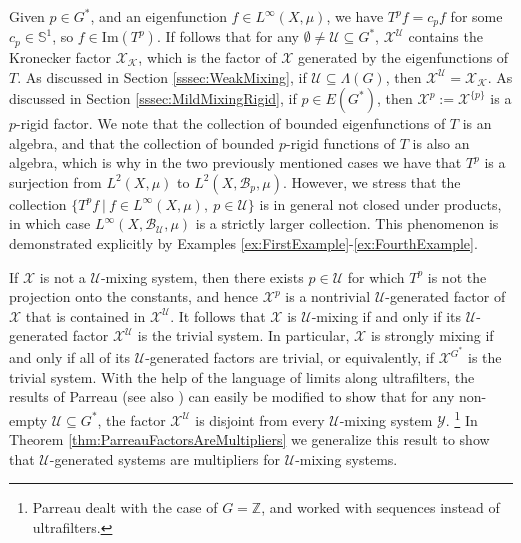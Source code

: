 \documentclass[graybox]{svmult}
\theoremstyle{definition}
\begin{document}
\begin{remark}\label{rem:PFactorBasics}
     Given $p \in G^*$, and an eigenfunction $f \in L^\infty(X,\mu)$, we have $T^pf = c_pf$ for some $c_p \in \mathbb{S}^1$, so $f \in \text{Im}(T^p)$.
     If follows that for any $\emptyset \neq \mathcal{U} \subseteq G^*$, $\mathcal{X}^\mathcal{U}$ contains the Kronecker factor $\mathcal{X}_\mathcal{K}$, which is the factor of $\mathcal{X}$ generated by the eigenfunctions of $T$.
     As discussed in Section \ref{sssec:WeakMixing}, if $\mathcal{U} \subseteq \Lambda(G)$, then $\mathcal{X}^\mathcal{U} = \mathcal{X}_\mathcal{K}$.
     As discussed in Section \ref{sssec:MildMixingRigid}, if $p \in E(G^*)$, then $\mathcal{X}^p := \mathcal{X}^{\{p\}}$ is a $p$-rigid factor.
     We note that the collection of bounded eigenfunctions of $T$ is an algebra, and that the collection of bounded $p$-rigid functions of $T$ is also an algebra, which is why in the two previously mentioned cases we have that $T^p$ is a surjection from $L^2(X,\mu)$ to $L^2(X,\mathscr{B}_p,\mu)$.
     However, we stress that the collection $\{T^pf\ |\ f \in L^\infty(X,\mu),\ p \in \mathcal{U}\}$ is in general not closed under products, in which case $L^\infty(X,\mathscr{B}_{\mathcal{U}},\mu)$ is a strictly larger collection.
     This phenomenon is demonstrated explicitly by Examples \ref{ex:FirstExample}-\ref{ex:FourthExample}.
\end{remark}

\begin{remark}\label{rem:UMixingIFFNoUParreauFactor}
    If $\mathcal{X}$ is not a $\mathcal{U}$-mixing system, then there exists $p \in \mathcal{U}$ for which $T^p$ is not the projection onto the constants, and hence $\mathcal{X}^p$ is a nontrivial $\mathcal{U}$-generated factor of $\mathcal{X}$ that is contained in $\mathcal{X}^\mathcal{U}$. 
    It follows that $\mathcal{X}$ is $\mathcal{U}$-mixing if and only if its $\mathcal{U}$-generated factor $\mathcal{X}^\mathcal{U}$ is the trivial system.
    In particular, $\mathcal{X}$ is strongly mixing if and only if all of its $\mathcal{U}$-generated factors are trivial, or equivalently, if $\mathcal{X}^{G^*}$ is the trivial system. With the help of the language of limits along ultrafilters, the results of 
    Parreau \cite{ParreauFactor} (see also \cite[Theorem 11]{Lemanczyk2009Spectral}) can easily be modified to show that for any non-empty $\mathcal U\subseteq G^*$, the factor $\mathcal{X}^\mathcal U$ is disjoint from every $\mathcal U$-mixing system $\mathcal{Y}$. \footnote{Parreau dealt with the case of $G = \mathbb{Z}$, and worked with sequences instead of ultrafilters.}
    In Theorem \ref{thm:ParreauFactorsAreMultipliers} we generalize this result to show that $\mathcal{U}$-generated systems are multipliers for $\mathcal{U}$-mixing systems.
\end{remark}
\end{document}
